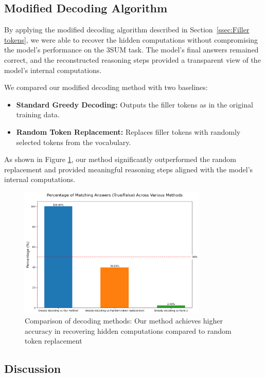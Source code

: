 \documentclass{article}
\begin{document}
\subsection{Modified Decoding Algorithm}

By applying the modified decoding algorithm described in Section~\ref{ssec:Filler tokens}, we were able to recover the hidden computations without compromising the model's performance on the 3SUM task. The model's final answers remained correct, and the reconstructed reasoning steps provided a transparent view of the model's internal computations.

We compared our modified decoding method with two baselines:

\begin{itemize}
    \item \textbf{Standard Greedy Decoding:} Outputs the filler tokens as in the original training data.
    \item \textbf{Random Token Replacement:} Replaces filler tokens with randomly selected tokens from the vocabulary.
\end{itemize}

As shown in Figure \ref{fig:token_comparison}, our method significantly outperformed the random replacement and provided meaningful reasoning steps aligned with the model's internal computations.

\begin{figure}[H]
\centering
\includegraphics[width=0.8\textwidth]{token_comparison_percentages.png}
\caption{Comparison of decoding methods: Our method achieves higher accuracy in recovering hidden computations compared to random token replacement}
\label{fig:token_comparison}
\end{figure}

\subsection{Discussion}
\end{document}
